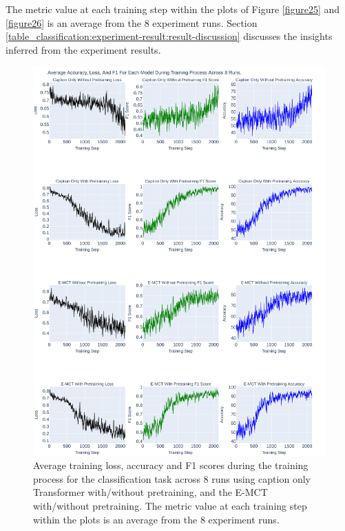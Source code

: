 The metric value at each training step within the plots of Figure \ref{figure25} and \ref{figure26} is an average from the 8 experiment runs. Section \ref{table_classification:experiment-result:result-discussion} discusses the insights inferred from the experiment results. 

\pagebreak
\begin{figure}[p!]
    \centering
    \includegraphics[width=0.96\maxwidth{\textwidth}]{src/images/Loss-Distriubiton-Train-Set-1.pdf}
    \caption{Average training loss, accuracy and F1 scores during the training process for the classification task across 8 runs using caption only Transformer with/without pretraining, and the E-MCT with/without pretraining. The metric value at each training step within the plots is an average from the 8 experiment runs.}
    \label{figure\arabic{figurecounter}}
\end{figure}

